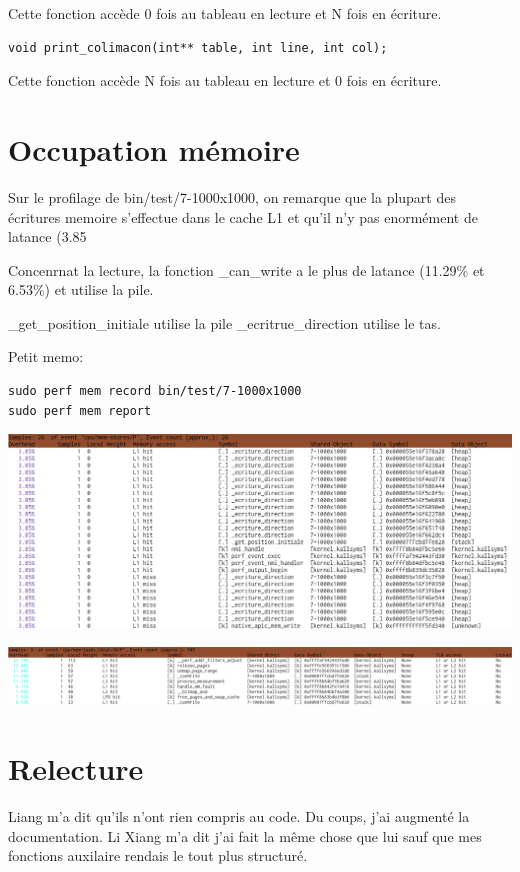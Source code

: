\documentclass[a4paper]{article}
\begin{document}
Cette fonction accède 0 fois au tableau en lecture et N fois en écriture.

\begin{lstlisting}[frame=single]
void print_colimacon(int** table, int line, int col);
\end{lstlisting}

Cette fonction accède N fois au tableau en lecture et 0 fois en écriture.

\section{Occupation mémoire}

Sur le profilage de bin/test/7-1000x1000, on remarque que la plupart des écritures
memoire s'effectue dans le cache L1 et qu'il n'y pas
enormément de latance (3.85%

Concenrnat la lecture, la fonction \_can\_write a le plus de latance
(11.29\% et 6.53\%) et utilise la pile.

\_get\_position\_initiale utilise la pile
\_ecritrue\_direction utilise le tas.

Petit memo:
\begin{lstlisting}[frame=single]
sudo perf mem record bin/test/7-1000x1000
sudo perf mem report
\end{lstlisting}

\includegraphics[width=1\textwidth]{mem-store-revert.png}

\includegraphics[width=1\textwidth]{mem-loads-revert.png}


\section{Relecture}

Liang m'a dit qu'ils n'ont rien compris au code. Du coups, j'ai augmenté la documentation.
Li Xiang m'a dit j'ai fait la même chose que lui sauf que mes fonctions auxilaire rendais le tout plus structuré.


\end{document}
